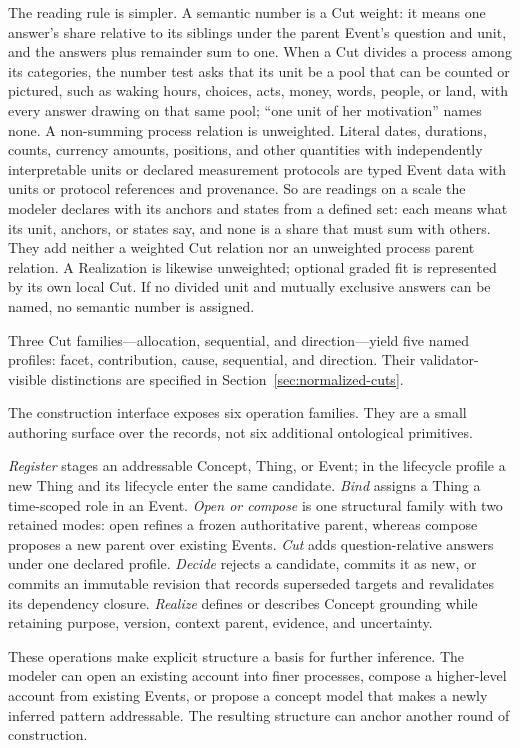 \documentclass[11pt,a4paper]{article}
\begin{document}
The reading rule is simpler. A semantic number is a Cut weight: it means one
answer's share relative to its siblings under the parent Event's question and
unit, and the answers plus remainder sum to one. When a Cut divides a process
among its categories, the number test asks that its unit be a pool that can be
counted or pictured, such as waking hours, choices, acts, money, words, people,
or land, with every answer drawing on that same pool; ``one unit of her
motivation'' names none. A non-summing process relation
is unweighted. Literal dates, durations, counts, currency amounts, positions,
and other quantities with independently interpretable units or declared
measurement protocols are typed Event data with units or protocol references
and provenance. So are readings on a scale the modeler declares with its anchors
and states from a defined set: each means what its unit, anchors, or states say,
and none is a share that must sum with others. They add neither a weighted Cut
relation nor an unweighted process parent relation. A Realization is likewise unweighted; optional
graded fit is represented by its own local Cut. If no divided unit and mutually
exclusive answers can be named, no semantic number is assigned.

Three Cut families---allocation, sequential, and direction---yield five named
profiles: facet, contribution, cause, sequential, and direction. Their
validator-visible distinctions are specified in Section~\ref{sec:normalized-cuts}.

The construction interface exposes six operation families. They are a small
authoring surface over the records, not six additional ontological primitives.

\emph{Register} stages an addressable Concept, Thing, or Event; in the lifecycle
profile a new Thing and its lifecycle enter the same candidate. \emph{Bind} assigns a
Thing a time-scoped role in an Event. \emph{Open or compose} is one structural
family with two retained modes: open refines a frozen authoritative parent,
whereas compose proposes a new parent over existing Events. \emph{Cut} adds
question-relative answers under one declared profile. \emph{Decide} rejects a
candidate, commits it as new, or commits an immutable revision that records
superseded targets and revalidates its dependency closure. \emph{Realize}
defines or describes Concept grounding while retaining purpose, version,
context parent, evidence, and uncertainty.

These operations make explicit structure a basis for further inference. The
modeler can open an existing account into finer processes, compose a higher-level
account from existing Events, or propose a concept model that makes a newly
inferred pattern addressable. The resulting structure can anchor another round
of construction.
\end{document}
